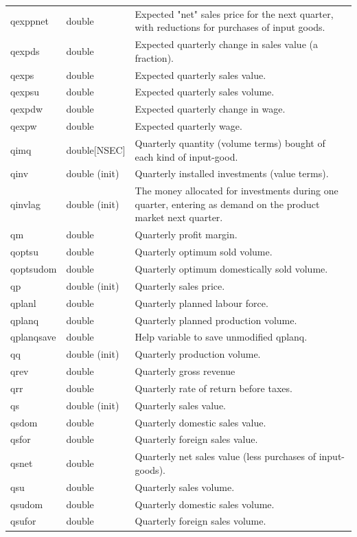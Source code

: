\documentclass{article}
\begin{document}
\begin{longtable}{p{}p{}p{}}
qexppnet & double & Expected "net" sales price for the next quarter, with reductions for purchases of input goods.\\
qexpds & double & Expected quarterly change in sales value (a fraction).\\
qexps & double & Expected quarterly sales value.\\
qexpsu & double & Expected quarterly sales volume.\\
qexpdw & double & Expected quarterly change in wage.\\
qexpw & double & Expected quarterly wage.\\
qimq & double[NSEC] & Quarterly quantity (volume terms) bought of each kind of input-good.\\
qinv & double (init) & Quarterly installed investments (value terms).\\
qinvlag & double (init) & The money allocated for investments during one quarter, entering as demand on the product market next quarter.\\
qm & double & Quarterly profit margin.\\
qoptsu & double & Quarterly optimum sold volume.\\
qoptsudom & double & Quarterly optimum domestically sold volume.\\
qp & double (init) & Quarterly sales price.\\
qplanl & double & Quarterly planned labour force.\\
qplanq & double & Quarterly planned production volume.\\
qplanqsave & double & Help variable to save unmodified qplanq.\\
qq & double (init) & Quarterly production volume.\\
qrev & double & Quarterly gross revenue\\
qrr & double & Quarterly rate of return before taxes.\\
qs & double (init) & Quarterly sales value.\\
qsdom & double & Quarterly domestic sales value.\\
qsfor & double & Quarterly foreign sales value.\\
qsnet & double & Quarterly net sales value (less purchases of input-goods).\\
qsu & double & Quarterly sales volume.\\
qsudom & double & Quarterly domestic sales volume.\\
qsufor & double & Quarterly foreign sales volume.\\

\end{longtable}
\end{document}
